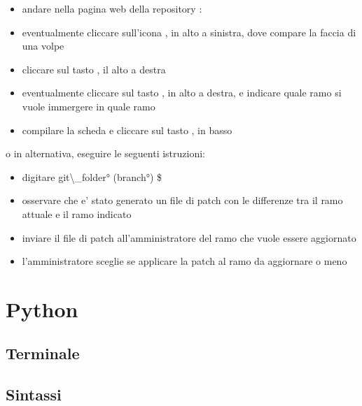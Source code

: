\begin{itemize}
\item[\bbox] andare nella pagina web della repository : 
\item[\bbox] eventualmente cliccare sull'icona , in alto a sinistra, dove compare la faccia di una volpe
\item[\bbox] cliccare sul tasto , il alto a destra
\item[\bbox] eventualmente cliccare sul tasto , in alto a destra, e indicare quale ramo si vuole immergere in quale ramo
\item[\bbox] compilare la scheda e cliccare sul tasto , in basso
\end{itemize}

\skipline

o in alternativa, eseguire le seguenti istruzioni:

\skipline

\begin{itemize}
\item[\bbox] digitare \ang{git\_folder} (\ang{branch}) \$ 
\item[\bbox] osservare che e' stato generato un file di patch con le differenze tra il ramo attuale e il ramo indicato
\item[\bbox] inviare il file di patch all'amministratore del ramo che vuole essere aggiornato
\item[\bbox] l'amministratore sceglie se applicare la patch al ramo da aggiornare o meno
\end{itemize}

\section{Python}

\subsection{Terminale}


\subsection{Sintassi}

